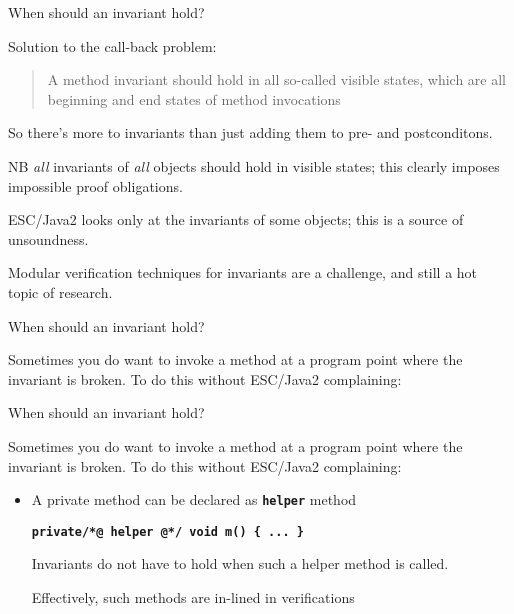 \documentclass[
pdf,
nocolorBG,
slideColor,
erik,
]{prosper}
\newcommand{\code}[1]{{\rm \texttt{\textbf{\small #1}}}}
\begin{document}
\begin{slide}{When should an invariant hold?}
\vspace*{-4ex}

Solution to the call-back problem:
\begin{quote}
A method invariant should hold in all so-called {\blue visible states},
which are all beginning and end states of method invocations
\end{quote}


So there's more to invariants than just adding them to pre- and postconditons.

\medskip

NB \textit{all} invariants of \textit{all} objects should hold in
visible states;
this clearly imposes impossible proof obligations.

\medskip

ESC/Java2 looks only at the invariants of some objects;
this is a source of unsoundness.

\medskip

Modular verification techniques for invariants are a challenge, and still 
a hot topic of research.

\end{slide}


\begin{slide}{When should an invariant hold?}
\vspace*{-4ex}

Sometimes you do want to invoke a method at a program point
where the invariant is broken.
To do this without ESC/Java2 complaining:

\end{slide}

\begin{slide}{When should an invariant hold?}
\vspace*{-4ex}

Sometimes you do want to invoke a method at a program point
where the invariant is broken.
To do this without ESC/Java2 complaining:

\begin{itemize}
\item
A private method can be declared as \code{helper} method
\begin{alltt}\code{\scriptsize private{\red /*@ helper @*/} void m() \{ ... \}}
\end{alltt}
Invariants do not have to hold when such a helper method is called.

\medskip

Effectively, such methods are in-lined in verifications

\end{itemize}

\end{slide}
\end{document}
